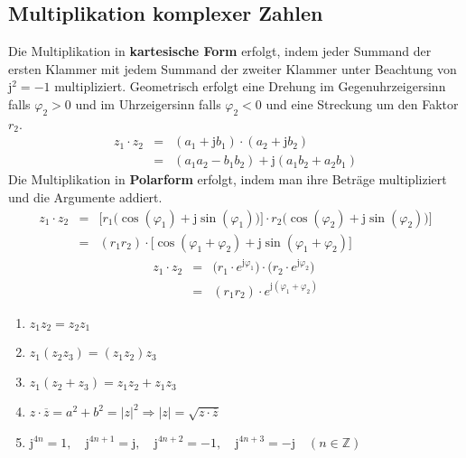 \subsection{Multiplikation komplexer Zahlen}
Die Multiplikation in \textbf{kartesische Form} erfolgt, indem jeder Summand der ersten Klammer mit jedem Summand der zweiter Klammer unter Beachtung von $\text{j}^2=-1$ multipliziert. Geometrisch erfolgt eine Drehung im Gegenuhrzeigersinn falls $\varphi_2>0$ und im Uhrzeigersinn falls $\varphi_2<0$ und eine Streckung um den Faktor $r_2$. 
\begin{equation}
\boxed{\begin{array}{lll}
z_1\cdot z_2&=&\left(a_1+\text{j}b_1\right)\cdot \left(a_2+\text{j}b_2\right)\\
&=&\left(a_1a_2-b_1b_2\right)+\text{j}\left(a_1b_2+a_2b_1\right)
\end{array}}
\end{equation}
Die Multiplikation in \textbf{Polarform} erfolgt, indem man ihre Beträge multipliziert und die Argumente addiert.
\begin{equation}
\boxed{\begin{array}{lll}
z_1\cdot z_2&=&\Big[r_1\Big(\cos\left(\varphi_1\right)+\text{j}\sin\left(\varphi_1\right)\Big)\Big]\cdot r_2\Big(\cos\left(\varphi_2\right)+\text{j}\sin\left(\varphi_2\right)\Big)\Big]\\
&=&\left(r_1r_2\right)\cdot \Big[\cos\left(\varphi_1+\varphi_2\right)+\text{j}\sin\left(\varphi_1+\varphi_2\right)\Big]
\end{array}}
\end{equation}
\begin{equation}
\boxed{\begin{array}{lll}
z_1\cdot z_2&=&\Big(r_1\cdot e^{\text{j}\varphi_1}\Big)\cdot \Big(r_2\cdot e^{\text{j}\varphi_2}\Big)\\
&=&\left(r_1r_2\right)\cdot e^{\text{j}\left(\varphi_1+\varphi_2\right)}
\end{array}}
\end{equation}
\begin{enumerate}[$(i)$]
\item $z_1z_2=z_2z_1$
\item $z_1\left(z_2z_3\right)=\left(z_1z_2\right)z_3$
\item $z_1\left(z_2+z_3\right)=z_1z_2+z_1z_3$
\item $z\cdot \overline{z}=a^2+b^2=\Big\vert z\Big\vert^2\Longrightarrow \Big\vert z\Big\vert=\sqrt{z\cdot \overline{z}}$
\item $\text{j}^{4n}=1,\quad \text{j}^{4n+1}=\text{j},\quad \text{j}^{4n+2}=-1,\quad \text{j}^{4n+3}=-\text{j}\quad \left(n\in \mathbb{Z}\right)$
\end{enumerate}
